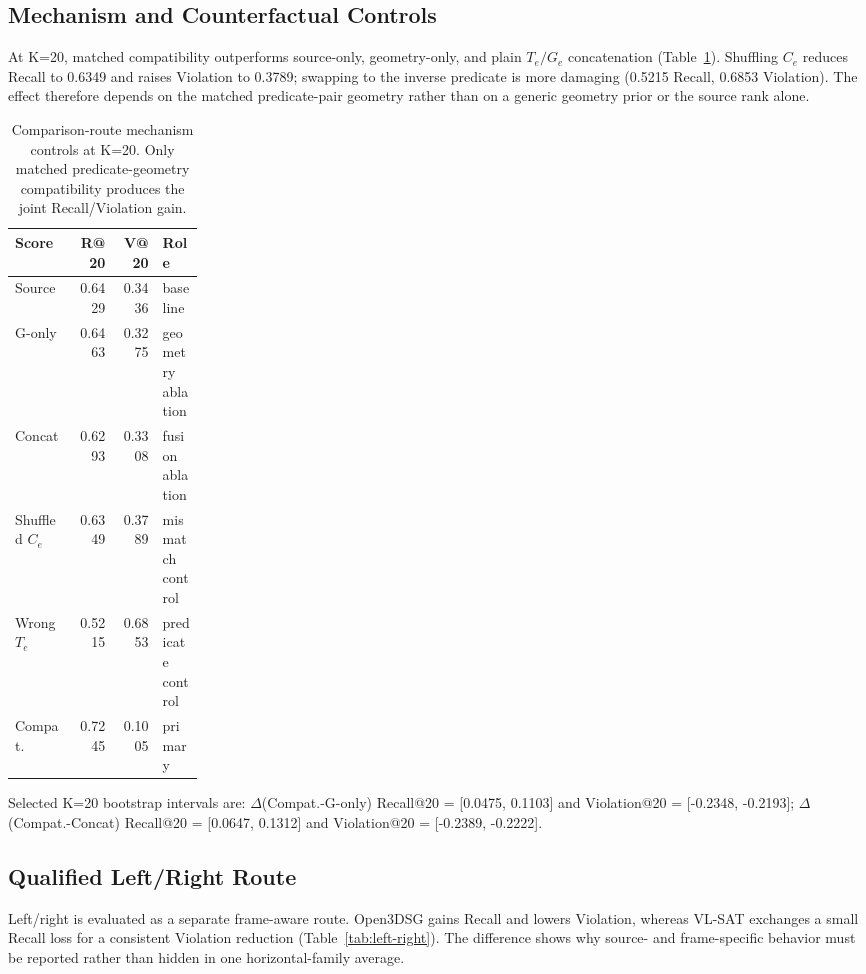 \documentclass[letterpaper]{article} %
\newcommand{\Te}{\ensuremath{T_e}}
\newcommand{\Ge}{\ensuremath{G_e}}
\begin{document}
\subsection{Mechanism and Counterfactual Controls}

At K=20, matched compatibility outperforms source-only, geometry-only, and
plain $\Te/\Ge$ concatenation (Table~\ref{tab:ablations}). Shuffling $C_e$
reduces Recall to 0.6349 and raises Violation to 0.3789; swapping to the inverse
predicate is more damaging (0.5215 Recall, 0.6853 Violation). The effect
therefore depends on the matched predicate-pair geometry rather than on a
generic geometry prior or the source rank alone.

\begin{table}[t]
\centering
\scriptsize
\setlength{\tabcolsep}{3pt}
\begin{tabular}{lrrp{0.22\linewidth}}
\toprule
Score & R@20 & V@20 & Role \\
\midrule
Source & 0.6429 & 0.3436 & baseline \\
G-only & 0.6463 & 0.3275 & geometry ablation \\
Concat & 0.6293 & 0.3308 & fusion ablation \\
Shuffled $C_e$ & 0.6349 & 0.3789 & mismatch control \\
Wrong $T_e$ & 0.5215 & 0.6853 & predicate control \\
Compat. & 0.7245 & 0.1005 & primary \\
\bottomrule
\end{tabular}
\caption{Comparison-route mechanism controls at K=20. Only matched
predicate-geometry compatibility produces the joint Recall/Violation gain.}
\label{tab:ablations}
\end{table}

Selected K=20 bootstrap intervals are:
$\Delta$(Compat.-G-only) Recall@20 = [0.0475, 0.1103] and Violation@20 =
[-0.2348, -0.2193]; $\Delta$(Compat.-Concat) Recall@20 = [0.0647, 0.1312] and
Violation@20 = [-0.2389, -0.2222].

\subsection{Qualified Left/Right Route}

Left/right is evaluated as a separate frame-aware route. Open3DSG gains Recall
and lowers Violation, whereas VL-SAT exchanges a small Recall loss for a
consistent Violation reduction (Table~\ref{tab:left-right}). The difference
shows why source- and frame-specific behavior must be reported rather than
hidden in one horizontal-family average.
\end{document}
